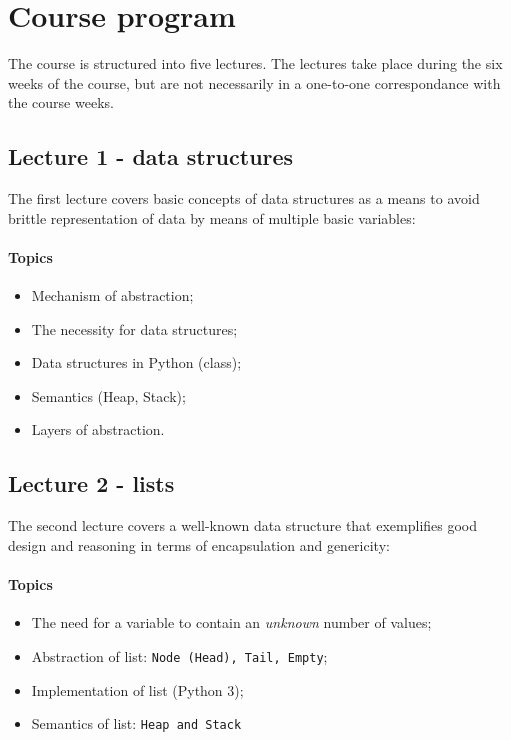 \section{Course program}
	The course is structured into five lectures. The lectures take place during the six weeks of the course, but are not necessarily in a one-to-one correspondance with the course weeks.

	\subsection{Lecture 1 - data structures}
		The first lecture covers basic concepts of data structures as a means to avoid brittle representation of data by means of multiple basic variables:

		\paragraph*{Topics}
			\begin{itemize}
				\item Mechanism of abstraction;
				\item The necessity for data structures;
				\item Data structures in Python (class);
				\item Semantics (Heap, Stack);
				\item Layers of abstraction.
			\end{itemize}

			\subsection{Lecture 2 - lists}
				The second lecture covers a well-known data structure that exemplifies good design and reasoning in terms of encapsulation and genericity:

				\paragraph*{Topics}
					\begin{itemize}
						\item The need for a variable to contain an \textit{unknown} number of values;
						\item Abstraction of list: \texttt{Node (Head), Tail, Empty};
						\item Implementation of list (Python 3);
						\item Semantics of list: \texttt{Heap and Stack}
					\end{itemize}

